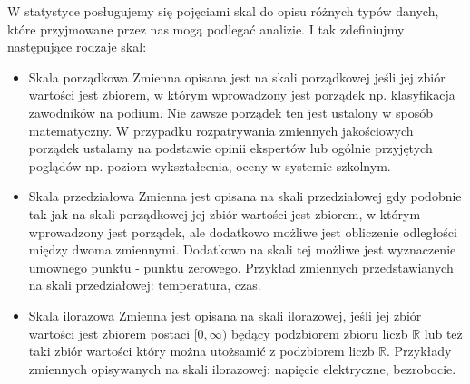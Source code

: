 \documentclass[12pt,a4paper]{report}
\begin{document}
W statystyce posługujemy się pojęciami skal do opisu różnych typów danych, które przyjmowane przez nas mogą podlegać analizie. I tak zdefiniujmy następujące rodzaje skal:

\begin{itemize}


\item Skala porządkowa \cite[Rozdział 1.2]{panek2013}
Zmienna opisana jest na skali porządkowej jeśli jej zbiór wartości jest zbiorem, w którym wprowadzony jest porządek np. klasyfikacja zawodników na podium. Nie zawsze porządek ten jest ustalony w sposób matematyczny. W przypadku rozpatrywania zmiennych jakościowych porządek ustalamy na podstawie opinii ekspertów lub ogólnie przyjętych poglądów np. poziom wykształcenia, oceny w systemie szkolnym. 


\item Skala przedziałowa \cite[Rozdział 1.2]{panek2013}
Zmienna jest opisana na skali przedziałowej gdy podobnie tak jak na skali porządkowej jej zbiór wartości jest zbiorem, w którym wprowadzony jest porządek, ale dodatkowo możliwe jest obliczenie odległości między dwoma zmiennymi. Dodatkowo na skali tej możliwe jest wyznaczenie umownego punktu - punktu zerowego. Przykład zmiennych przedstawianych na skali przedziałowej: temperatura, czas.


\item Skala ilorazowa \cite[Rozdział 1.2]{panek2013}
Zmienna jest opisana na skali ilorazowej, jeśli jej zbiór wartości jest zbiorem postaci $[0, \infty)$ będący podzbiorem zbioru liczb $\mathbb{R}$ lub też taki zbiór wartości który można utożsamić z podzbiorem liczb $\mathbb{R}$. Przykłady zmiennych opisywanych na skali ilorazowej: napięcie elektryczne, bezrobocie. 


\end{itemize}
\end{document}
